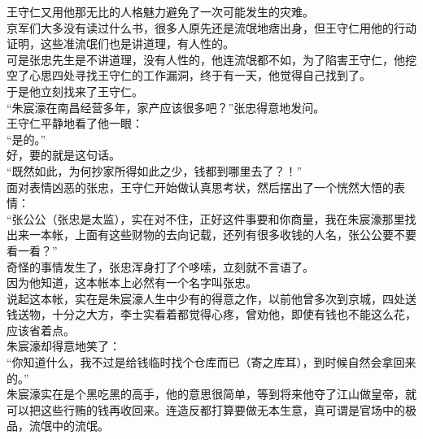 \begin{multicols}{\theparacolNo}
王守仁又用他那无比的人格魅力避免了一次可能发生的灾难。\\

京军们大多没有读过什么书，很多人原先还是流氓地痞出身，但王守仁用他的行动证明，这些准流氓们也是讲道理，有人性的。\\

可是张忠先生是不讲道理，没有人性的，他连流氓都不如，为了陷害王守仁，他挖空了心思四处寻找王守仁的工作漏洞，终于有一天，他觉得自己找到了。\\

于是他立刻找来了王守仁。\\

“朱宸濠在南昌经营多年，家产应该很多吧？”张忠得意地发问。\\

王守仁平静地看了他一眼：\\

“是的。”\\

好，要的就是这句话。\\

“既然如此，为何抄家所得如此之少，钱都到哪里去了？！”\\

面对表情凶恶的张忠，王守仁开始做认真思考状，然后摆出了一个恍然大悟的表情：\\

“张公公（张忠是太监），实在对不住，正好这件事要和你商量，我在朱宸濠那里找出来一本帐，上面有这些财物的去向记载，还列有很多收钱的人名，张公公要不要看一看？”\\

奇怪的事情发生了，张忠浑身打了个哆嗦，立刻就不言语了。\\

因为他知道，这本帐本上必然有一个名字叫张忠。\\

说起这本帐，实在是朱宸濠人生中少有的得意之作，以前他曾多次到京城，四处送钱送物，十分之大方，李士实看着都觉得心疼，曾劝他，即使有钱也不能这么花，应该省着点。\\

朱宸濠却得意地笑了：\\

“你知道什么，我不过是给钱临时找个仓库而已（寄之库耳），到时候自然会拿回来的。”\\

朱宸濠实在是个黑吃黑的高手，他的意思很简单，等到将来他夺了江山做皇帝，就可以把这些行贿的钱再收回来。连造反都打算要做无本生意，真可谓是官场中的极品，流氓中的流氓。\\


\end{multicols}
